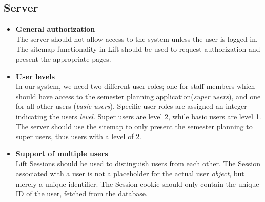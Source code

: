 \subsection{Server}
\label{sub:req_server}
\begin{itemize}
	\item \textbf{General authorization}\\
	The server should not allow access to the system unless the user is logged in. The sitemap functionality in Lift should be used to request authorization and present the appropriate pages.
	\item \textbf{User levels}\\
	In our system, we need two different user roles; one for staff members which should have access to the semester planning application(\emph{super users}), and one for all other users (\emph{basic users}). Specific user roles are assigned an integer indicating the users \emph{level}. Super users are level 2, while basic users are level 1. The server should use the sitemap to only present the semester planning to super users, thus users with a level of 2. 
	\item \textbf{Support of multiple users}\\
	Lift Sessions should be used to distinguish users from each other. The Session associated with a user is not a placeholder for the actual user \emph{object}, but merely a unique identifier. The Session cookie should only contain the unique ID of the user, fetched from the database.
\end{itemize}

